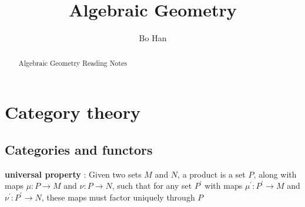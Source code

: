 \documentclass{article}
\title{Algebraic Geometry}
\author{Bo Han}
\begin{document}
\maketitle

\begin{abstract}
Algebraic Geometry Reading Notes
\end{abstract}

\newpage
{}
\setcounter{page}{1}
\tableofcontents
\newpage
\setcounter{page}{1}

\section{Category theory}
\subsection{Categories and functors}
\textbf{universal property} :  Given two sets $M$ and $N$, a product is a set $P$, along with maps $\mu: P \rightarrow M$ and $\nu: P \rightarrow N$, such that for any set $P^\prime$ with maps $\mu^\prime: P^\prime \rightarrow M$ and $\nu^\prime: P^\prime \rightarrow N$, these maps must factor uniquely through $P$
\end{document}
